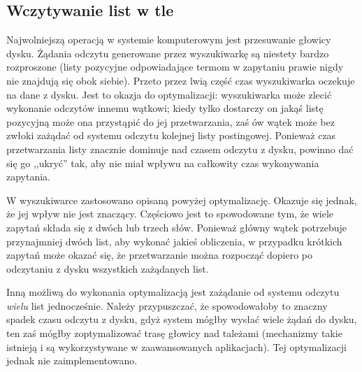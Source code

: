 \documentclass[a4paper,12pt]{article}
\begin{document}
\subsection{Wczytywanie list w tle}
Najwolniejszą operacją w systemie komputerowym jest przesuwanie głowicy
dysku. Żądania odczytu generowane przez wyszukiwarkę są niestety bardzo
rozproszone (listy pozycyjne odpowiadające termom w zapytaniu prawie
nigdy nie znajdują się obok siebie). Przeto przez lwią część czas
wyszukiwarka oczekuje na dane z dysku. Jest to okazja do optymalizacji:
wyszukiwarka może zlecić wykonanie odczytów innemu wątkowi; kiedy tylko
dostarczy on jakąś listę pozycyjną może ona przystąpić do jej przetwarzania,
zaś ów wątek może bez zwłoki zażądać od systemu odczytu kolejnej listy
postingowej. Ponieważ czas przetwarzania listy znacznie dominuje nad czasem
odczytu z dysku, powinno dać się go ,,ukryć'' tak, aby nie miał wpływu na
całkowity czas wykonywania zapytania.

W wyszukiwarce zastosowano opisaną powyżej optymalizację. Okazuje się jednak,
że jej wpływ nie jest znaczący. Częściowo jest to spowodowane tym, że wiele
zapytań składa się z dwóch lub trzech słów. Ponieważ główny wątek potrzebuje
przynajmniej dwóch list, aby wykonać jakieś obliczenia, w przypadku krótkich
zapytań może okazać się, że przetwarzanie można rozpocząć dopiero po odczytaniu
z dysku wszystkich zażądanych list.

Inną możliwą do wykonania optymalizacją jest zażądanie od systemu odczytu
\textit{wielu} list jednocześnie. Należy przypuszczać, że spowodowałoby
to znaczny spadek czasu odczytu z dysku, gdyż system mógłby wysłać wiele
żądań do dysku, ten zaś mógłby zoptymalizować trasę głowicy nad tależami
(mechanizmy takie istnieją i są wykorzystywane w zaawansowanych aplikacjach).
Tej optymalizacji jednak nie zaimplementowano.
\end{document}
